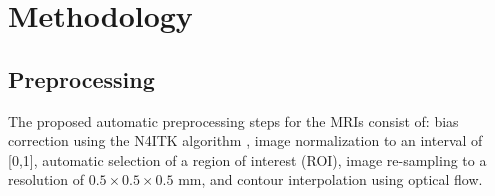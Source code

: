 \section{Methodology}
\label{sec:methods}



\subsection{Preprocessing}
\label{subsec:prepro}
The proposed automatic preprocessing steps for the MRIs consist of:
bias correction using the N4ITK algorithm \cite{n4itk}, 
image normalization to an interval of [0,1],
automatic selection of a region of interest (ROI), 
image re-sampling to a resolution of $0.5 \times 0.5 \times 0.5$ mm, 
and contour interpolation using optical flow.

